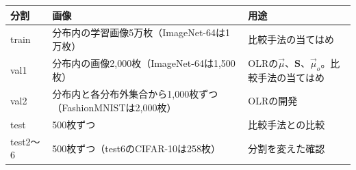 \documentclass[border=3pt]{standalone}
\begin{document}
%
\begin{tabular}{lll}%
\toprule
分割 & 画像 & 用途\\
\midrule
train & 分布内の学習画像5万枚（ImageNet-64は1万枚） & 比較手法の当てはめ\\
val1 & 分布内の画像2,000枚（ImageNet-64は1,500枚） & OLRの$\vec{\mu}$、$\mathbf{S}$、$\vec{\mu}_{o}$。比較手法の当てはめ\\
val2 & 分布内と各分布外集合から1,000枚ずつ（FashionMNISTは2,000枚） & OLRの開発\\
test & 500枚ずつ & 比較手法との比較\\
test2〜6 & 500枚ずつ（test6のCIFAR-10は258枚） & 分割を変えた確認\\
\bottomrule
\end{tabular}%
\end{document}
